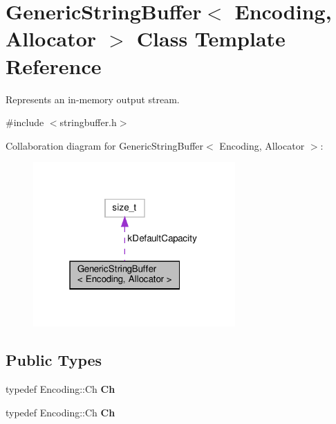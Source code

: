 \hypertarget{classGenericStringBuffer}{}\section{Generic\+String\+Buffer$<$ Encoding, Allocator $>$ Class Template Reference}
\label{classGenericStringBuffer}


Represents an in-\/memory output stream.  




{\ttfamily \#include $<$stringbuffer.\+h$>$}



Collaboration diagram for Generic\+String\+Buffer$<$ Encoding, Allocator $>$\+:
\nopagebreak
\begin{figure}[H]
\begin{center}
\leavevmode
\includegraphics[width=219pt]{classGenericStringBuffer__coll__graph}
\end{center}
\end{figure}
\subsection*{Public Types}
\begin{DoxyCompactItemize}
\item 
\mbox{\label{classGenericStringBuffer_a735b75db076ffe86d0d294be49655d46}} 
typedef Encoding\+::\+Ch {\bfseries Ch}
\item 
\mbox{\label{classGenericStringBuffer_a735b75db076ffe86d0d294be49655d46}} 
typedef Encoding\+::\+Ch {\bfseries Ch}
\end{DoxyCompactItemize}
